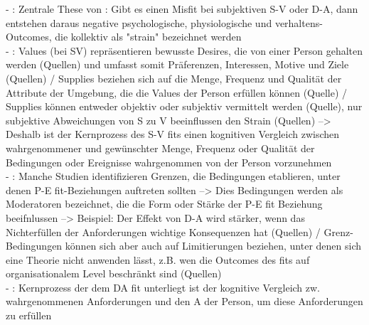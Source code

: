 - \cite[S. 2]{edwards:1990}: Zentrale These von \textcite{mechanismsOfJobStressAndStrain:1982}: Gibt es einen Misfit bei subjektiven S-V oder D-A, dann entstehen daraus negative psychologische, physiologische und verhaltens-Outcomes, die kollektiv als "strain" bezeichnet werden \\
- \cite[S. 3]{edwards:1996}: Values (bei SV) repräsentieren bewusste Desires, die von einer Person gehalten werden (Quellen) und umfasst somit Präferenzen, Interessen, Motive und Ziele (Quellen) / Supplies beziehen sich auf die Menge, Frequenz und Qualität der Attribute der Umgebung, die die Values der Person erfüllen können (Quelle) / Supplies können entweder objektiv oder subjektiv vermittelt werden (Quelle), nur subjektive Abweichungen von S zu V beeinflussen den Strain (Quellen) --> Deshalb ist der Kernprozess des S-V fits einen kognitiven Vergleich zwischen wahrgenommener und gewünschter Menge, Frequenz oder Qualität der Bedingungen oder Ereignisse wahrgenommen von der Person vorzunehmen \\
- \cite[S. 6]{edwards:2008}: Manche Studien identifizieren Grenzen, die Bedingungen etablieren, unter denen P-E fit-Beziehungen auftreten sollten --> Dies Bedingungen werden als Moderatoren bezeichnet, die die Form oder Stärke der P-E fit Beziehung beeifnlussen --> Beispiel: Der Effekt von D-A wird stärker, wenn das Nichterfüllen der Anforderungen wichtige Konsequenzen hat (Quellen) / Grenz-Bedingungen können sich aber auch auf Limitierungen beziehen, unter denen sich eine Theorie nicht anwenden lässt, z.B. wen die Outcomes des fits auf organisationalem Level beschränkt sind (Quellen) \\
- \cite[S. 5f.]{edwards:1996}: Kernprozess der dem DA fit unterliegt ist der kognitive Vergleich zw. wahrgenommenen Anforderungen und den A der Person, um diese Anforderungen zu erfüllen\\
